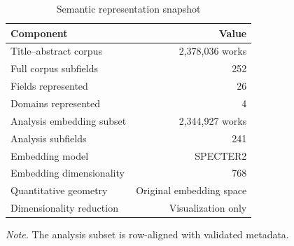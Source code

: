 \begin{table}[H]
\centering
\caption{Semantic representation snapshot}
\label{tab:embedding_snapshot}
\footnotesize
\begin{tabular}{p{} r}
\hline
\textbf{Component} & \textbf{Value} \\
\hline
Title--abstract corpus & 2,378,036 works \\
Full corpus subfields & 252 \\
Fields represented & 26 \\
Domains represented & 4 \\
Analysis embedding subset & 2,344,927 works \\
Analysis subfields & 241 \\
Embedding model & SPECTER2 \\
Embedding dimensionality & 768 \\
Quantitative geometry & Original embedding space \\
Dimensionality reduction & Visualization only \\
\hline
\end{tabular}
\par\vspace{0.2cm}
\footnotesize\textit{Note.} The analysis subset is row-aligned with validated metadata.
\end{table}
